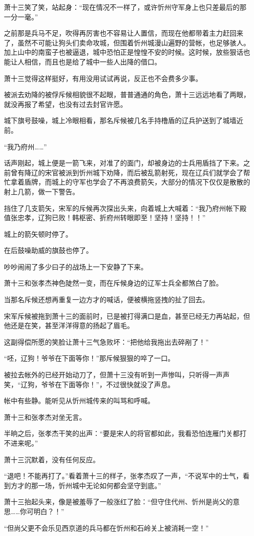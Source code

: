 萧十三笑了笑，站起身：“现在情况不一样了，或许忻州守军身上也只差最后的那一分一毫。”

之前那是兵马不足，吹得再厉害也不容易让人置信，而现在他都带着主力赶回来了，虽然不可能让狗头们卖命攻城，但围着忻州城漫山遍野的营帐，也足够骇人。加上山中的南蛮子也被逼退，城中恐怕正是惶惶不安的时候。这时候，放些狠话也能让人相信，而且也是给了城中一些人出降的借口。

萧十三觉得这样挺好，有用没用试试再说，反正也不会费多少事。

被派去劝降的被俘斥候相貌很不起眼，普普通通的角色，萧十三远远地看了两眼，就没再报了希望，也没有过去封官许愿。

城下旗号鼓噪，城上冷眼相看，那名斥候被几名手持橹盾的辽兵护送到了城墙近前。

“我乃府州……”

话声刚起，城上便是一箭飞来，对准了的面门，却被身边的士兵用盾挡了下来。之前曾有降辽的宋官被派到忻州城下劝降，而后被乱箭射死，现在辽兵们就学会了帮忙拿着盾牌，而城上的守军也学会了不再浪费箭矢，大部分的情况下仅仅是散散的射上几箭，做一下警告。

挡住了几支箭矢，宋军的斥候再次探出头来，向着城上大喊着：“我乃府州帐下殿值张忠孝，辽狗已败！韩枢密、折府州转眼即至！坚持！坚持！！”

城上的箭矢顿时停了。

在后鼓噪助威的旗鼓也停了。

吵吵闹闹了多少曰子的战场上一下安静了下来。

萧十三和张孝杰神色陡然一变，而在斥候身边的辽军士兵全都煞白了脸。

当那名斥候还想再重复一边方才的喊话，便被横拖竖拽的扯了回去。

宋军斥候被拖到萧十三的面前时，已是被打得满口是血，甚至已经无力再站起，但他还是在笑，甚至洋洋得意的扬起了眉毛。

这副得偿所愿的笑脸让萧十三气急败坏：“把他给我拖出去碎剐了！”

“呸，辽狗！爷爷在下面等你！”那斥候狠狠的啐了一口。

被拉去帐外的已经开始动刀了，但萧十三没有听到一声惨叫，只听得一声声笑，“辽狗，爷爷在下面等你！”，不过很快就没了声息。

帐中有些静。能听见从忻州城传来的叫骂和呼喊。

萧十三和张孝杰对坐无言。

半晌之后，张孝杰干笑的出声：“要是宋人的将官都如此，我看恐怕连雁门关都打不进来呢。”

萧十三沉默着，没有任何反应。

“退吧！不能再打了。”看着萧十三的样子，张孝杰叹了一声，“不说军中的士气，看到方才的那一场，忻州城中无论如何都会坚守到底。”

萧十三抬起头来，像是被羞辱了一般涨红了脸：“但守住代州、忻州是尚父的意思……你可明白？！”

“但尚父更不会乐见西京道的兵马都在忻州和石岭关上被消耗一空！”
